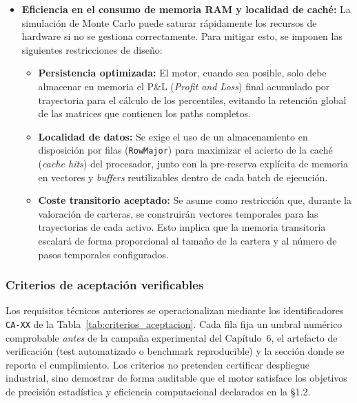\documentclass[11pt]{article}
\begin{document}
\begin{itemize}
    \item \textbf{Eficiencia en el consumo de memoria RAM y localidad de caché:}
    La simulación de Monte Carlo puede saturar rápidamente los recursos de hardware si no se gestiona correctamente. Para mitigar esto, se imponen las siguientes restricciones de diseño:
    \begin{itemize}
        \item \textbf{Persistencia optimizada:} El motor, cuando sea posible, solo debe almacenar en memoria el P\&L (\textit{Profit and Loss}) final acumulado por trayectoria para el cálculo de los percentiles, evitando la retención global de las matrices que contienen los paths completos.
        \item \textbf{Localidad de datos:} Se exige el uso de un almacenamiento en disposición por filas (\texttt{RowMajor}) para maximizar el acierto de la caché (\textit{cache hits}) del procesador, junto con la pre-reserva explícita de memoria en vectores y \textit{buffers} reutilizables dentro de cada batch de ejecución.
        \item \textbf{Coste transitorio aceptado:} Se asume como restricción que, durante la valoración de carteras, se construirán vectores temporales para las trayectorias de cada activo. Esto implica que la memoria transitoria escalará de forma proporcional al tamaño de la cartera y al número de pasos temporales configurados.
    \end{itemize}
\end{itemize}

\subsubsection{Criterios de aceptación verificables}

Los requisitos técnicos anteriores se operacionalizan mediante los identificadores \texttt{CA-XX} de la Tabla~\ref{tab:criterios_aceptacion}. Cada fila fija un umbral numérico comprobable \emph{antes} de la campaña experimental del Capítulo~6, el artefacto de verificación (test automatizado o benchmark reproducible) y la sección donde se reporta el cumplimiento. Los criterios no pretenden certificar despliegue industrial, sino demostrar de forma auditable que el motor satisface los objetivos de precisión estadística y eficiencia computacional declarados en la §1.2.
\end{document}
